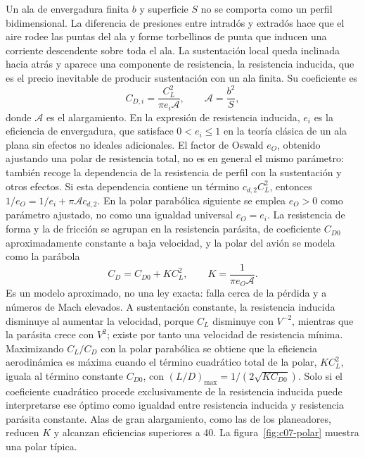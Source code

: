 \documentclass[10pt,openany]{book}
\begin{document}
Un ala de envergadura finita \(b\) y superficie \(S\) no se comporta como un perfil bidimensional. La diferencia de presiones entre intradós y extradós hace que el aire rodee las puntas del ala y forme torbellinos de punta que inducen una corriente descendente sobre toda el ala. La sustentación local queda inclinada hacia atrás y aparece una componente de resistencia, la resistencia inducida, que es el precio inevitable de producir sustentación con un ala finita. Su coeficiente es
\begin{equation}
C_{D,i} = \frac{C_L^{2}}{\pi e_i \mathcal{A}}, \qquad \mathcal{A} = \frac{b^{2}}{S}, \label{eq:c07-inducida}
\end{equation}
donde \(\mathcal{A}\) es el alargamiento. En la expresión de resistencia inducida, \(e_i\) es la eficiencia de envergadura, que satisface \(0<e_i\le1\) en la teoría clásica de un ala plana sin efectos no ideales adicionales. El factor de Oswald \(e_O\), obtenido ajustando una polar de resistencia total, no es en general el mismo parámetro: también recoge la dependencia de la resistencia de perfil con la sustentación y otros efectos. Si esta dependencia contiene un término \(c_{d,2}C_L^2\), entonces \(1/e_O=1/e_i+\pi\mathcal{A}c_{d,2}\). En la polar parabólica siguiente se emplea \(e_O>0\) como parámetro ajustado, no como una igualdad universal \(e_O=e_i\). La resistencia de forma y la de fricción se agrupan en la resistencia parásita, de coeficiente \(C_{D0}\) aproximadamente constante a baja velocidad, y la polar del avión se modela como la parábola
\begin{equation}
C_D = C_{D0} + K C_L^{2}, \qquad K = \frac{1}{\pi e_O\mathcal{A}}. \label{eq:c07-polar}
\end{equation}
Es un modelo aproximado, no una ley exacta: falla cerca de la pérdida y a números de Mach elevados. A sustentación constante, la resistencia inducida disminuye al aumentar la velocidad, porque \(C_L\) disminuye con \(V^{-2}\), mientras que la parásita crece con \(V^{2}\); existe por tanto una velocidad de resistencia mínima. Maximizando \(C_L/C_D\) con la polar parabólica se obtiene que la eficiencia aerodinámica es máxima cuando el término cuadrático total de la polar, \(K C_L^2\), iguala al término constante \(C_{D0}\), con \((L/D)_{\max} = 1/(2\sqrt{K C_{D0}})\). Solo si el coeficiente cuadrático procede exclusivamente de la resistencia inducida puede interpretarse ese óptimo como igualdad entre resistencia inducida y resistencia parásita constante. Alas de gran alargamiento, como las de los planeadores, reducen \(K\) y alcanzan eficiencias superiores a 40. La figura~\ref{fig:c07-polar} muestra una polar típica.
\end{document}
